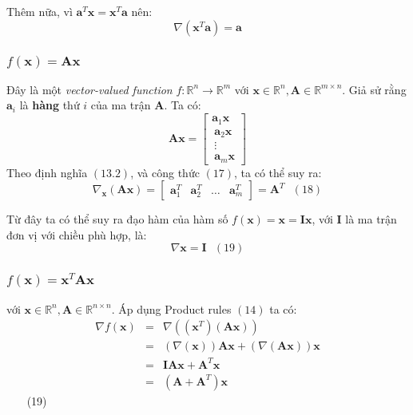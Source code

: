 Thêm nữa, vì $\mathbf{a}^T\mathbf{x} = \mathbf{x}^T\mathbf{a}$ nên: 
\begin{equation*} 
\nabla (\mathbf{x}^T\mathbf{a}) = \mathbf{a} 
\end{equation*} 
 
 
\subsubsection{$f(\mathbf{x}) = \mathbf{Ax}$}
Đây là một \textit{vector-valued function} $f: \mathbb{R}^n \rightarrow \mathbb{R}^{m} $ với $\mathbf{x} \in \mathbb{R}^n, \mathbf{A} \in \mathbb{R}^{m\times n}$. Giả sử rằng $\mathbf{a}_i$ là \textbf{hàng} thứ $i$ của ma trận $\mathbf{A}$. Ta có:  
\begin{equation*} 
\mathbf{Ax}  =  
\left[ 
\begin{matrix} 
    \mathbf{a}_1\mathbf{x} \\\ 
    \mathbf{a}_2\mathbf{x} \\\ 
    \vdots\\\ 
    \mathbf{a}_m\mathbf{x}  
\end{matrix} 
\right] 
\end{equation*} 
Theo định nghĩa $(13.2)$, và công thức $(17)$, ta có thể suy ra: 
\begin{equation*} 
\nabla_{\mathbf{x}} (\mathbf{Ax}) =  
\left[ 
\begin{matrix} 
    \mathbf{a}_1^T & \mathbf{a}_2^T & \dots & \mathbf{a}_m^T 
\end{matrix} 
\right] = \mathbf{A}^T ~~~ (18) 
\end{equation*} 
 
Từ đây ta có thể suy ra đạo hàm của hàm số $f(\mathbf{x}) = \mathbf{x} = \mathbf{Ix}$, với $\mathbf{I}$ là ma trận đơn vị với chiều phù hợp, là: 
\begin{equation*} 
\nabla \mathbf{x} = \mathbf{I} ~~~ (19) 
\end{equation*} 
 
\subsubsection{$f(\mathbf{x}) = \mathbf{x}^T\mathbf{A} \mathbf{x}$}
với $\mathbf{x} \in \mathbb{R}^n, \mathbf{A} \in \mathbb{R}^{n\times n}$. Áp dụng Product rules $(14)$ ta có: 
\begin{eqnarray} 
\nabla f(\mathbf{x}) &=& \nabla \left(\left(\mathbf{x}^T\right) \left(\mathbf{Ax}\right)\right) \\\ 
                     &=& \left(\nabla (\mathbf{x})\right) \mathbf{Ax} + \left(\nabla (\mathbf{Ax})\right)\mathbf{x} \\\  
                     & = & \mathbf{IAx} + \mathbf{A}^T\mathbf{x} \\\ 
                     & = & (\mathbf{A} + \mathbf{A}^T)\mathbf{x} 
\end{eqnarray} ~~~ (19) 
 
